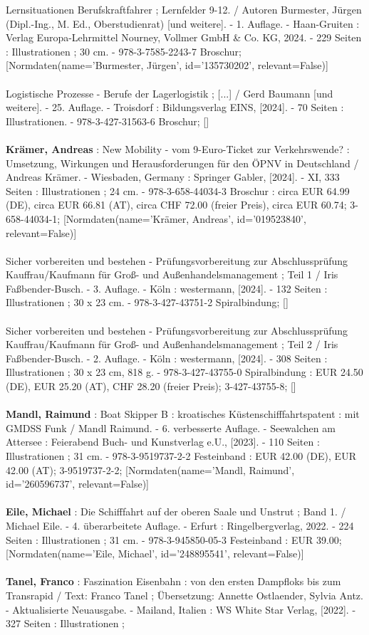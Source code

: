 \documentclass{article}
\begin{document}
\begin{multicols}{3}
Lernsituationen Berufskraftfahrer ; Lernfelder 9-12. / Autoren Burmester, Jürgen (Dipl.-Ing., M. Ed., Oberstudienrat) [und weitere]. - 1. Auflage. - Haan-Gruiten : Verlag Europa-Lehrmittel Nourney, Vollmer GmbH \& Co. KG, 2024. - 229 Seiten : Illustrationen ; 30 cm. - 978-3-7585-2243-7 Broschur; [Normdaten(name='Burmester, Jürgen', id='135730202', relevant=False)]\\\\Logistische Prozesse - Berufe der Lagerlogistik ; [...] / Gerd Baumann [und weitere]. - 25. Auflage. - Troisdorf : Bildungsverlag EINS, [2024]. - 70 Seiten : Illustrationen. - 978-3-427-31563-6 Broschur; []\\\\\textbf{Krämer, Andreas} : New Mobility - vom 9-Euro-Ticket zur Verkehrswende? : Umsetzung, Wirkungen und Herausforderungen für den ÖPNV in Deutschland / Andreas Krämer. - Wiesbaden, Germany : Springer Gabler, [2024]. - XI, 333 Seiten : Illustrationen ; 24 cm. - 978-3-658-44034-3 Broschur : circa EUR 64.99 (DE), circa EUR 66.81 (AT), circa CHF 72.00 (freier Preis), circa EUR 60.74; 3-658-44034-1; [Normdaten(name='Krämer, Andreas', id='019523840', relevant=False)]\\\\Sicher vorbereiten und bestehen - Prüfungsvorbereitung zur Abschlussprüfung Kauffrau/Kaufmann für Groß- und Außenhandelsmanagement ; Teil 1 / Iris Faßbender-Busch. - 3. Auflage. - Köln : westermann, [2024]. - 132 Seiten : Illustrationen ; 30 x 23 cm. - 978-3-427-43751-2 Spiralbindung; []\\\\Sicher vorbereiten und bestehen - Prüfungsvorbereitung zur Abschlussprüfung Kauffrau/Kaufmann für Groß- und Außenhandelsmanagement ; Teil 2 / Iris Faßbender-Busch. - 2. Auflage. - Köln : westermann, [2024]. - 308 Seiten : Illustrationen ; 30 x 23 cm, 818 g. - 978-3-427-43755-0 Spiralbindung : EUR 24.50 (DE), EUR 25.20 (AT), CHF 28.20 (freier Preis); 3-427-43755-8; []\\\\\textbf{Mandl, Raimund} : Boat Skipper B : kroatisches Küstenschifffahrtspatent : mit GMDSS Funk / Mandl Raimund. - 6. verbesserte Auflage. - Seewalchen am Attersee : Feierabend Buch- und Kunstverlag e.U., [2023]. - 110 Seiten : Illustrationen ; 31 cm. - 978-3-9519737-2-2 Festeinband : EUR 42.00 (DE), EUR 42.00 (AT); 3-9519737-2-2; [Normdaten(name='Mandl, Raimund', id='260596737', relevant=False)]\\\\\textbf{Eile, Michael} : Die Schifffahrt auf der oberen Saale und Unstrut ; Band 1. / Michael Eile. - 4. überarbeitete Auflage. - Erfurt : Ringelbergverlag, 2022. - 224 Seiten : Illustrationen ; 31 cm. - 978-3-945850-05-3 Festeinband : EUR 39.00; [Normdaten(name='Eile, Michael', id='248895541', relevant=False)]\\\\\textbf{Tanel, Franco} : Faszination Eisenbahn : von den ersten Dampfloks bis zum Transrapid / Text: Franco Tanel ; Übersetzung: Annette Ostlaender, Sylvia Antz. - Aktualisierte Neuausgabe. - Mailand, Italien : WS White Star Verlag, [2022]. - 327 Seiten : Illustrationen ; 
\end{multicols}
\end{document}
